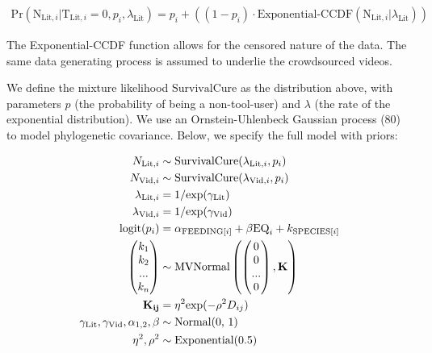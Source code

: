 \documentclass[
  man,floatsintext]{apa6}
\begin{document}
\begin{align}
\text{Pr}(\text{N}_{\text{Lit},i}|\text{T}_{\text{Lit},i} = 0,p_i,\lambda_\text{Lit}) = p_i + ((1-p_i)\cdot\text{Exponential-CCDF}(\text{N}_{\text{Lit},i}|\lambda_\text{Lit}))
\end{align}

The Exponential-CCDF function allows for the censored nature of the data. The
same data generating process is assumed to underlie the crowdsourced videos.

We define the mixture likelihood \(\text{SurvivalCure}\) as the distribution
above, with parameters \(p\) (the probability of being a non-tool-user)
and \(\lambda\) (the rate of the exponential distribution). We use an
Ornstein-Uhlenbeck Gaussian process (80) to model phylogenetic
covariance. Below, we specify the full model with priors:

\begin{align}
N_{\text{Lit},i} &\sim \text{SurvivalCure}(\lambda_{\text{Lit},i}, p_{i}) \\
N_{\text{Vid},i} &\sim \text{SurvivalCure}(\lambda_{\text{Vid},i}, p_{i}) \nonumber \\
\lambda_{\text{Lit},i} &= 1 / \text{exp}(\gamma_\text{Lit}) \nonumber \\
\lambda_{\text{Vid},i} &= 1 / \text{exp}(\gamma_\text{Vid}) \nonumber \\
\text{logit}(p_{i}) &= \alpha_{\text{FEEDING}[i]} + \beta\text{EQ}_{i} +  k_{\text{SPECIES}[i]} \nonumber \\
\begin{pmatrix}k_{1}\\k_{2}\\...\\k_{n}\\\end{pmatrix}
&\sim \text{MVNormal}
\begin{pmatrix}\begin{pmatrix}0\\0\\...\\0\\\end{pmatrix},\bf{K}\end{pmatrix} \nonumber \\
\bf{K}_{ij} &= \eta^2\text{exp}(-\rho^2D_{ij}) \nonumber \\
\gamma_\text{Lit}, \gamma_\text{Vid}, \alpha_{1,2}, \beta &\sim \text{Normal(0, 1)} \nonumber \\
\eta^2, \rho^2 &\sim \text{Exponential(0.5)} \nonumber
\end{align}
\end{document}
